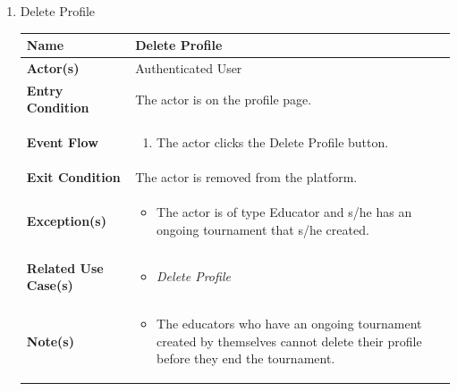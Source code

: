 \begin{enumerate}
\item Delete Profile
\begin{center}
    \begin{tabular}{ | m{10em} | m{10cm}| } 
      \hline
      \textbf{Name} & Delete Profile  \\ 
      \hline
      \textbf{Actor(s)} & Authenticated User \\ 
      \hline
      \textbf{Entry Condition} & The actor is on the profile page. \\ 
      \hline
      \textbf{Event Flow} & 
          \begin{enumerate}[(1)]
              \item The actor clicks the Delete Profile button.
          \end{enumerate}
      \\ 
      \hline
      \textbf{Exit Condition} & The actor is removed from the platform.  \\ 
      \hline
      \textbf{Exception(s)} & 
      \begin{itemize}
          \item The actor is of type Educator and s/he has an ongoing tournament that s/he created.
      \end{itemize}
          \\ 
      \hline
      \textbf{Related Use Case(s)} & 
      \begin{itemize}
          \item \textit{Delete Profile}
      \end{itemize}
          \\ 
      \hline
      \textbf{Note(s)} & 
      \begin{itemize}
          \item The educators who have an ongoing tournament created by themselves cannot delete their profile before they end the tournament.
      \end{itemize}
          \\ 
      \hline
    \end{tabular}
\end{center}


\end{enumerate}
